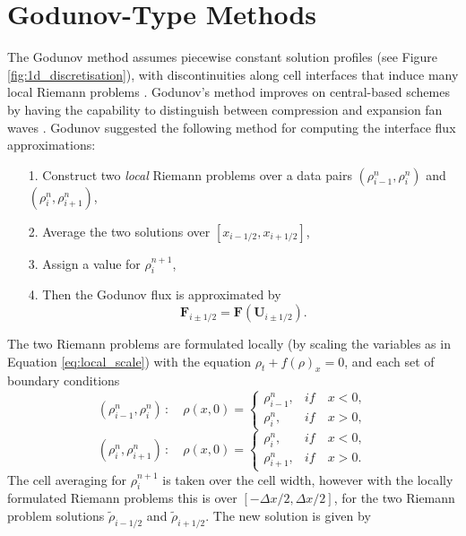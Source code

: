 	
\section{Godunov-Type Methods}
\label{sec:Godunov}

	The Godunov method assumes piecewise constant solution profiles (see Figure \ref{fig:1d_discretisation}), with discontinuities along cell interfaces that induce many local Riemann problems \cite{Toro09}. Godunov's method improves on central-based schemes by having the capability to distinguish between compression and expansion fan waves \cite{Jayanti18}. Godunov \cite{Godunov59} suggested the following method for computing the interface flux approximations:
	\begin{itemize}
	\item[1.] Construct two \emph{local} Riemann problems over a data pairs $(\rho_{i-1}^n,\rho_{i}^n)$ and $(\rho_i^n,\rho_{i+1}^n)$,
	\item[2.] Average the two solutions over $[x_{i-1/2},x_{i+1/2}]$,
	\item[3.] Assign a value for $\rho_i^{n+1}$,
	\item[4.] Then the Godunov flux is approximated by
		      \begin{equation}
		      	\mathbf{F}_{i\pm1/2}=\mathbf{F}\left(\mathbf{U}_{i\pm1/2}\right). \nonumber
		      \end{equation}
	\end{itemize}
	The two Riemann problems are formulated locally (by scaling the variables as in Equation \ref{eq:local_scale}) with the equation $\rho_t+f(\rho)_x=0$, and each set of boundary conditions
	\begin{equation}
		(\rho_{i-1}^n,\rho_{i}^n) \, : \quad \rho(x,0)=
		\begin{cases}
			\rho_{i-1}^n, & if \quad x<0, \\
			\rho_i^n, & if \quad x>0,
		\end{cases}
		\nonumber
	\end{equation}
	\begin{equation}
		(\rho_i^n,\rho_{i+1}^n) \, : \quad \rho(x,0)=
		\begin{cases}
			\rho_i^n, & if \quad x<0, \\
			\rho_{i+1}^n, & if \quad x>0.
		\end{cases}
		\nonumber
	\end{equation}
	The cell averaging for $\rho_i^{n+1}$ is taken over the cell width, however with the locally formulated Riemann problems this is over $[-\Delta x/2,\Delta x/2]$, for the two Riemann problem solutions $\tilde \rho_{i-1/2}$ and $\tilde \rho_{i+1/2}$. The new solution is given by
